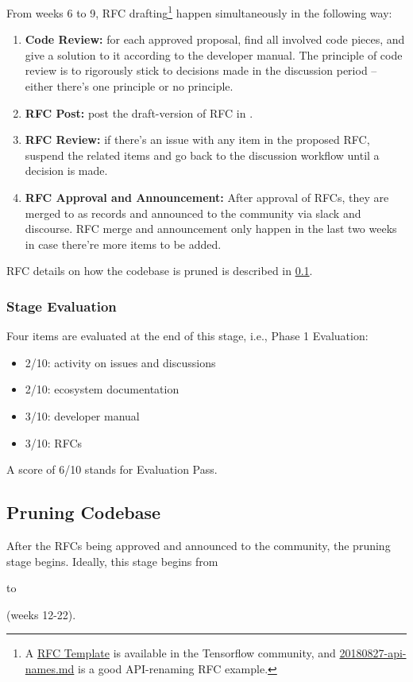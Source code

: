 From weeks 6 to 9, RFC drafting\footnote{A \href{https://github.com/tensorflow/community/blob/master/rfcs/yyyymmdd-rfc-template.md}{RFC Template} is available in the Tensorflow community, and \href{https://github.com/tensorflow/community/blob/master/rfcs/20180827-api-names.md}{20180827-api-names.md} is a good API-renaming RFC example.} happen simultaneously in the following way:
\begin{enumerate}
    \item \textbf{Code Review:} for each approved proposal, find all involved code pieces, and give a solution to it according to the developer manual. The principle of code review is to rigorously stick to decisions made in the discussion period -- either there's one principle or no principle.
    \item \textbf{RFC Post:} post the draft-version of RFC in \repogsoctempdoc{}.
    \item \textbf{RFC Review:} if there's an issue with any item in the proposed RFC, suspend the related items and go back to the discussion workflow until a decision is made.
    \item \textbf{RFC Approval and Announcement:} After approval of RFCs, they are merged to \repoimagesgithubio{} as records and announced to the community via slack and discourse. RFC merge and announcement only happen in the last two weeks in case there're more items to be added.
\end{enumerate}
RFC details on how the codebase is pruned is described in \cref{subsec:prune}.

\subsubsection*{Stage Evaluation}

Four items are evaluated at the end of this stage, i.e., \textsf{Phase 1 Evaluation}:
\begin{itemize}
    \item 2/10: activity on issues and discussions
    \item 2/10: ecosystem documentation
    \item 3/10: developer manual
    \item 3/10: RFCs
\end{itemize}
A score of 6/10 stands for \textsf{Evaluation Pass}.

\subsection{Pruning Codebase}\label{subsec:prune}
After the RFCs being approved and announced to the community, the pruning stage begins. Ideally, this stage begins from \date{July 1} to \date{August 26} (weeks 12-22).

